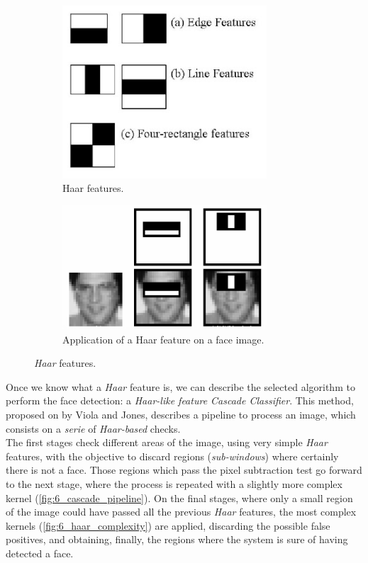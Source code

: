 		\begin{figure}[h]
			\centering
			\begin{subfigure}[b]{0.4\textwidth}
				\centering
				\includegraphics[width=3in]{images/haar_features}
				\caption{Haar features.}
				\label{fig:6_haar_feats}
			\end{subfigure}
			\hspace{1in}
			\begin{subfigure}[b]{0.4\textwidth}
				\centering
				\includegraphics[width=3in]{images/haar_on_face}
				\caption{Application of a Haar feature on a face image.}
				\label{fig:6_haar_on_face}
			\end{subfigure}
			\caption{\emph{Haar} features.}
		\end{figure}
		
		
		Once we know what a \emph{Haar} feature is, we can describe the selected algorithm to perform the face detection: a \emph{Haar-like feature Cascade Classifier}. This method, proposed on \cite{haar-cascade} by Viola and Jones, describes a pipeline to process an image, which consists on a \emph{serie} of \emph{Haar-based} checks.\\
		
		The first stages check different areas of the image, using very simple \emph{Haar} features, with the objective to discard regions (\emph{sub-windows}) where certainly there is not a face. Those regions which pass the pixel subtraction test go forward to the next stage, where the process is repeated with a slightly more complex kernel (\autoref{fig:6_cascade_pipeline}). On the final stages, where only a small region of the image could have passed all the previous \emph{Haar} features, the most complex kernels (\autoref{fig:6_haar_complexity}) are applied, discarding the possible false positives, and obtaining, finally, the regions where the system is sure of having detected a face.\\
		
